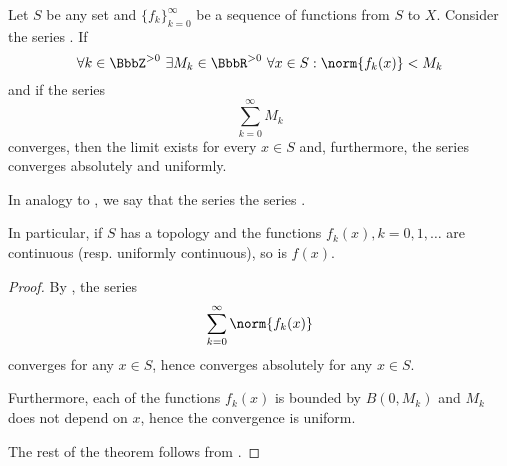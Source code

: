 \begin{corollary}\label{thm:weierstrass_series_criterion}
  Let \( S \) be any set and \( \{ f_k \}_{k=0}^\infty \) be a sequence of functions from \( S \) to \( X \). Consider the series . If
  \begin{equation*}
    \forall k \in \BbbZ^{>0} \ \exists M_k \in \BbbR^{>0} \ \forall x \in S : \norm{f_k(x)} < M_k
  \end{equation*}
  and if the series
  \begin{equation}\label{thm:weierstrass_series_criterion/dominating}
    \sum_{k=0}^\infty M_k
  \end{equation}
  converges, then the limit  exists for every \( x \in S \) and, furthermore, the series converges absolutely and uniformly.

  In analogy to , we say that the series   the series .

  In particular, if \( S \) has a topology and the functions \( f_k(x), k = 0, 1, \ldots \) are continuous (resp. uniformly continuous), so is \( f(x) \).
\end{corollary}
\begin{proof}
  By , the series
  \begin{equation*}
    \sum_{k=0}^\infty \norm{f_k(x)}
  \end{equation*}
  converges for any \( x \in S \), hence  converges absolutely for any \( x \in S \).

  Furthermore, each of the functions \( f_k(x) \) is bounded by \( B(0, M_k) \) and \( M_k \) does not depend on \( x \), hence the convergence is uniform.

  The rest of the theorem follows from .
\end{proof}

